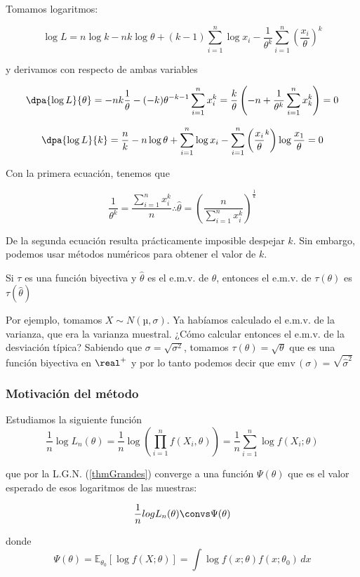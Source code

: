 \documentclass{apuntes}
\begin{document}
Tomamos logaritmos:

\[ \log L = n\log k - nk\log \theta + (k-1)\sum_{i=1}^n\log x_i - \frac{1}{\theta^k} \sum_{i=1}^n \left(\frac{x_i}{\theta}\right)^k\]

y derivamos con respecto de ambas variables

\[ \dpa{\log L}{\theta} = -nk \frac{1}{\theta} - (-k) \theta^{-k-1} \sum_{i=1}^nx_i^k = \frac{k}{\theta}\left(-n + \frac{1}{\theta^k}\sum_{i=1}^nx_k^k\right) = 0 \]

\[ \dpa{\log L}{k} = \frac{n}{k} -n\log\theta + \sum_{i=1}^n \log x_i - \sum_{i=1}^n\left(\frac{x_i}{\theta}^k\right) \log\frac{x_1}{\theta} = 0 \]

Con la primera ecuación, tenemos que

\[ \frac{1}{\theta^k} = \frac{\sum_{i=1}^n x_i^k}{n} \therefore \hat{\theta} = \left(\frac{n}{\sum_{i=1}^n x_i^k}\right)^\frac{1}{k} \]

De la segunda ecuación resulta prácticamente imposible despejar $k$. Sin embargo, podemos usar métodos numéricos para obtener el valor de $k$. 

\begin{theorem} Si $\tau$ es una función biyectiva y $\hat{\theta}$ es el e.m.v. de $\theta$, entonces el e.m.v. de $\tau(\theta)$ es $\tau(\hat\theta)$
\end{theorem}

Por ejemplo, tomamos $X\sim N(µ, \sigma)$. Ya habíamos calculado el e.m.v. de la varianza, que era la varianza muestral. ¿Cómo calcular entonces el e.m.v. de la desviación típica? Sabiendo que $\sigma = \sqrt{\sigma^2}$, tomamos $\tau(\theta) = \sqrt{\theta}$ que es una función biyectiva en $\real^+$ y por lo tanto podemos decir que $\text{emv}\,(\sigma) = \sqrt{\hat\sigma^2}$

\subsubsection{Motivación del método}
Estudiamos la siguiente función
\[ \frac{1}{n}\log L_n(\theta) = \frac{1}{n} \log \left(\prod_{i=1}^nf(X_i,\theta)\right) = \frac{1}{n}\sum_{i=1}^n \log f(X_i;\theta) \]

que por la L.G.N. (\ref{thmGrandes}) converge a una función $\Psi(\theta)$ que es el valor esperado de esos logaritmos de las muestras:

\[ \frac{1}{n} log L_n(\theta) \convs \Psi(\theta) \]

donde \[ \Psi(\theta) = \mathbb{E}_{\theta_0} \left[\log f(X;\theta)\right] = \int\log f(x;\theta) f(x;\theta_0) \, dx \]
\end{document}
